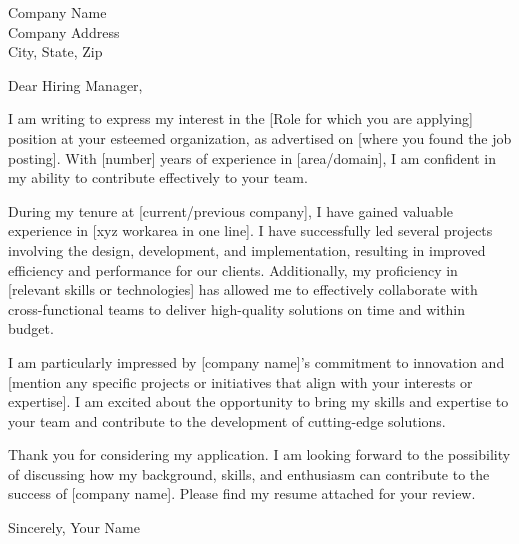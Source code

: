 \documentclass{letter}
\begin{document}
\begin{letter}{Company Name \\ Company Address \\ City, State, Zip}

\opening{Dear Hiring Manager,}

I am writing to express my interest in the [Role for which you are applying] position at your esteemed organization, as advertised on [where you found the job posting]. With [number] years of experience in [area/domain], I am confident in my ability to contribute effectively to your team.

During my tenure at [current/previous company], I have gained valuable experience in [xyz workarea in one line]. I have successfully led several projects involving the design, development, and implementation, resulting in improved efficiency and performance for our clients. Additionally, my proficiency in [relevant skills or technologies] has allowed me to effectively collaborate with cross-functional teams to deliver high-quality solutions on time and within budget.

I am particularly impressed by [company name]'s commitment to innovation and [mention any specific projects or initiatives that align with your interests or expertise]. I am excited about the opportunity to bring my skills and expertise to your team and contribute to the development of cutting-edge solutions.

Thank you for considering my application. I am looking forward to the possibility of discussing how my background, skills, and enthusiasm can contribute to the success of [company name]. Please find my resume attached for your review.

\closing{Sincerely, Your Name}

\end{letter}
\end{document}
